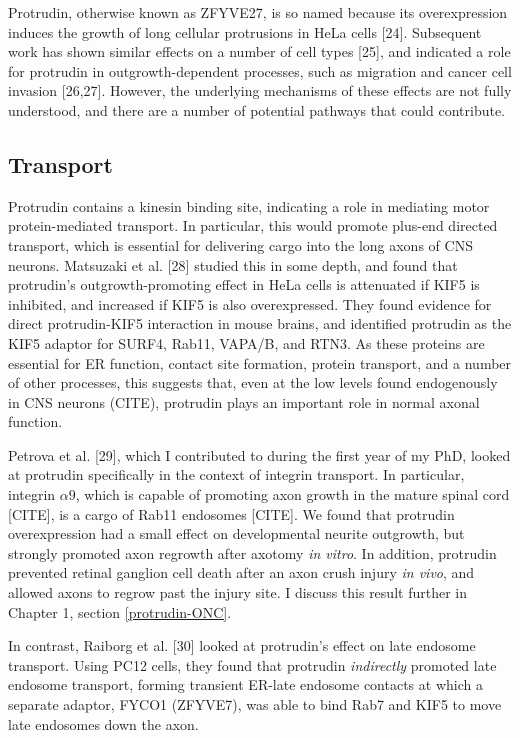 \documentclass[
  12pt,
  a4paper,
]{book}
\begin{document}
Protrudin, otherwise known as ZFYVE27, is so named because its overexpression induces the growth of long cellular protrusions in HeLa cells {[}24{]}. Subsequent work has shown similar effects on a number of cell types {[}25{]}, and indicated a role for protrudin in outgrowth-dependent processes, such as migration and cancer cell invasion {[}26,27{]}. However, the underlying mechanisms of these effects are not fully understood, and there are a number of potential pathways that could contribute.

\hypertarget{intro-ptdn-transport}{%
\subsection{Transport}\label{intro-ptdn-transport}}

Protrudin contains a kinesin binding site, indicating a role in mediating motor protein-mediated transport. In particular, this would promote plus-end directed transport, which is essential for delivering cargo into the long axons of CNS neurons. Matsuzaki et al. {[}28{]} studied this in some depth, and found that protrudin's outgrowth-promoting effect in HeLa cells is attenuated if KIF5 is inhibited, and increased if KIF5 is also overexpressed. They found evidence for direct protrudin-KIF5 interaction in mouse brains, and identified protrudin as the KIF5 adaptor for SURF4, Rab11, VAPA/B, and RTN3. As these proteins are essential for ER function, contact site formation, protein transport, and a number of other processes, this suggests that, even at the low levels found endogenously in CNS neurons (CITE), protrudin plays an important role in normal axonal function.

Petrova et al. {[}29{]}, which I contributed to during the first year of my PhD, looked at protrudin specifically in the context of integrin transport. In particular, integrin \(\alpha9\), which is capable of promoting axon growth in the mature spinal cord {[}CITE{]}, is a cargo of Rab11 endosomes {[}CITE{]}. We found that protrudin overexpression had a small effect on developmental neurite outgrowth, but strongly promoted axon regrowth after axotomy \emph{in vitro}. In addition, protrudin prevented retinal ganglion cell death after an axon crush injury \emph{in vivo}, and allowed axons to regrow past the injury site. I discuss this result further in Chapter 1, section \ref{protrudin-ONC}.

In contrast, Raiborg et al. {[}30{]} looked at protrudin's effect on late endosome transport. Using PC12 cells, they found that protrudin \emph{indirectly} promoted late endosome transport, forming transient ER-late endosome contacts at which a separate adaptor, FYCO1 (ZFYVE7), was able to bind Rab7 and KIF5 to move late endosomes down the axon.
\end{document}
